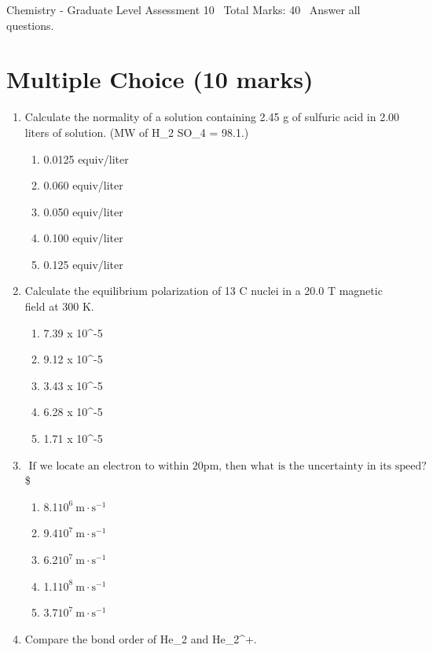 \documentclass[12pt]{article}
\begin{document}
\begin{center}
Chemistry - Graduate Level Assessment 10 \
Total Marks: 40 \
Answer all questions.
\end{center}

\section*{Multiple Choice (10 marks)}
\begin{enumerate}[label=\arabic*.]
\item Calculate the normality of a solution containing 2.45 g of sulfuric acid in 2.00 liters of solution. (MW of H\_2 SO\_4 = 98.1.)
\begin{enumerate}[label=(\alph*)]
    \item 0.0125 equiv/liter
    \item 0.060 equiv/liter
    \item 0.050 equiv/liter
    \item 0.100 equiv/liter
    \item 0.125 equiv/liter
\end{enumerate}
\item Calculate the equilibrium polarization of 13 C nuclei in a 20.0 T magnetic field at 300 K.
\begin{enumerate}[label=(\alph*)]
    \item 7.39 x 10^-5
    \item 9.12 x 10^-5
    \item 3.43 x 10^-5
    \item 6.28 x 10^-5
    \item 1.71 x 10^-5
\end{enumerate}
\item $ \text { If we locate an electron to within } 20 \mathrm{pm} \text {, then what is the uncertainty in its speed? } $\$
\begin{enumerate}[label=(\alph*)]
    \item 8.1$10^6 \mathrm{~m} \cdot \mathrm{s}^{-1}$
    \item 9.4$10^7 \mathrm{~m} \cdot \mathrm{s}^{-1}$
    \item 6.2$10^7 \mathrm{~m} \cdot \mathrm{s}^{-1}$
    \item 1.1$10^8 \mathrm{~m} \cdot \mathrm{s}^{-1}$
    \item 3.7$10^7 \mathrm{~m} \cdot \mathrm{s}^{-1}$
\end{enumerate}
\item Compare the bond order of He\_2 and He\_2^+.
\begin{enumerate}[label=(\alph*)]

\end{enumerate}
\end{enumerate}
\end{document}
